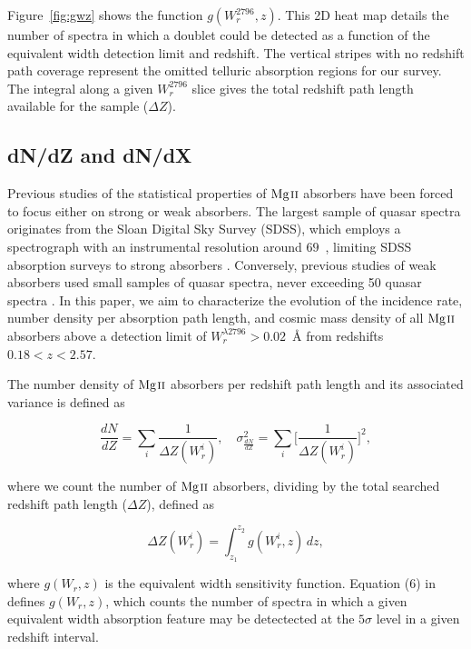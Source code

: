 \documentclass[iop,apj,numberedappendix,appendixfloats,twocolappendix]{emulateapj}
\begin{document}
Figure~\ref{fig:gwz} shows the function $g(W_r^{2796}, z)$. This 2D heat map details the number of spectra in which a {\MgIIdblt} doublet could be detected as a function of the equivalent width detection limit and redshift. The vertical stripes with no redshift path coverage represent the omitted telluric absorption regions for our survey. The integral along a given $W_r^{2796}$ slice gives the total redshift path length available for the sample ($\Delta Z$). 

\subsection{dN/dZ and dN/dX}
\label{dndzdndx}

Previous studies of the statistical properties of ${\hbox{{\rm Mg}\kern 0.1em{\sc ii}}}$ absorbers have been forced to focus either on strong or weak absorbers. The largest sample of quasar spectra originates from the Sloan Digital Sky Survey (SDSS), which employs a spectrograph with an instrumental resolution around $69$~{\kms}, limiting SDSS absorption surveys to strong absorbers \citep{Tytler1987,Nestor2005,Zhu2013,Cooksey2013}. Conversely, previous studies of weak absorbers used small samples of quasar spectra, never exceeding 50 quasar spectra \citep{Steidel1992,Narayanan2005,Kacprzak2011}. In this paper, we aim to characterize the evolution of the incidence rate, number density per absorption path length, and cosmic mass density of all ${\hbox{{\rm Mg}\kern 0.1em{\sc ii}}}$ absorbers above a detection limit of $W_r^{\lambda2796} > 0.02$~{\AA} from redshifts $0.18 < z < 2.57$.

The number density of ${\hbox{{\rm Mg}\kern 0.1em{\sc ii}}}$ absorbers per redshift path length and its associated variance is defined as

\begin{equation}
\frac{d N}{d Z} = \sum_{i}\frac{1}{\Delta Z(W_r^i)},\quad \sigma^2_{\frac{d N}{d Z}} = \sum_{i} \Big[\frac{1}{\Delta Z(W_r^i)}\Big]^2,
\label{eqn:dndz}
\end{equation}

where we count the number of ${\hbox{{\rm Mg}\kern 0.1em{\sc ii}}}$ absorbers, dividing by the total searched redshift path length ($\Delta Z$), defined as

\begin{equation}
\Delta Z(W_r^i) = \int_{z_1}^{z_2} g(W_r^i, z)\,dz,
\label{eqn:deltaz}
\end{equation}

where $g(W_r, z)$ is the equivalent width sensitivity function. Equation (6) in \cite{Lanzetta1987} defines $g(W_r, z)$, which counts the number of spectra in which a given equivalent width absorption feature may be detectected at the $5\sigma$ level in a given redshift interval. 
\end{document}
